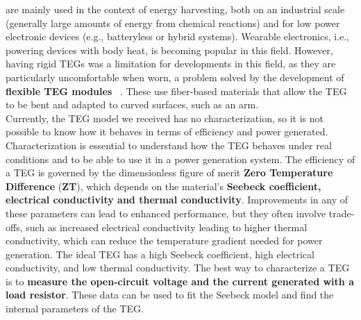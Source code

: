% 
% 
% 
% 


 are mainly used in the context of energy harvesting, both on an industrial scale (generally large amounts of energy from chemical reactions) and for low power electronic devices (e.g., batteryless or hybrid systems). Wearable electronics, i.e., powering devices with body heat, is becoming popular in this field. However, having rigid TEGs was a limitation for developments in this field, as they are particularly uncomfortable when worn, a problem solved by the development of \textbf{flexible TEG modules} ~\cite{flexibletegc}. These use fiber-based materials that allow the TEG to be bent and adapted to curved surfaces, such as an arm.
\\
Currently, the TEG model we received has no characterization, so it is not possible to know how it behaves in terms of efficiency and power generated.
Characterization is essential to understand how the TEG behaves under real conditions and to be able to use it in a power generation system.
The efficiency of a TEG is governed by the dimensionless figure of merit \textbf{Zero Temperature Difference} (\textbf{ZT}), which depends on the material's \textbf{Seebeck coefficient, electrical conductivity and thermal conductivity}.
Improvements in any of these parameters can lead to enhanced performance, but they often involve trade-offs, such as increased electrical conductivity leading to higher thermal conductivity, which can reduce the temperature gradient needed for power generation.
The ideal TEG has a high Seebeck coefficient, high electrical conductivity, and low thermal conductivity.
The best way to characterize a TEG is to \textbf{measure the open-circuit voltage and the current generated with a load resistor}. 
These data can be used to fit the Seebeck model and find the internal parameters of the TEG. 

